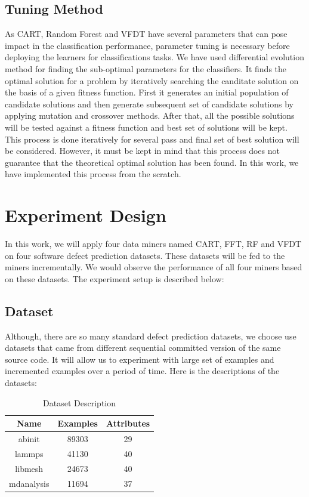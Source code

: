 \documentclass[sigplan]{acmart}\settopmatter{printfolios=true,printccs=false,printacmref=false}
\begin{document}
\subsection{Tuning Method}
As CART, Random Forest and VFDT have several parameters that can pose impact in the classification performance, parameter tuning is necessary before deploying the learners for classifications tasks. We have used differential evolution method for finding the sub-optimal parameters for the classifiers. It finds the optimal solution for a problem by iteratively searching the canditate solution on the basis of a given fitness function. First it generates an initial population of candidate solutions and then generate subsequent set of candidate solutions by applying mutation and crossover methods. After that, all the possible solutions will be tested against a fitness function and best set of solutions will be kept. This process is done iteratively for several pass and final set of best solution will be considered. However, it must be kept in mind that this process does not guarantee that the theoretical optimal solution has been found. In this work, we have implemented this process from the scratch. 


\section{Experiment Design}
In this work, we will apply four data miners named CART, FFT, RF and VFDT on four software defect prediction datasets. These datasets will be fed to the miners incrementally. We would observe the performance of all four miners based on these datasets. The experiment setup is described below:

\subsection{Dataset}
Although, there are so many standard defect prediction datasets, we choose use datasets that came from different sequential committed version of the same source code. It will allow us to experiment with large set of examples and incremented examples over a period of time. Here is the descriptions of the datasets:

\begin{center}
	\begin{table}[h]
			\begin{tabular}{|c|c|c|}
			\hline 
			\textbf{Name} & \textbf{Examples} & \textbf{Attributes} \\ 
			\hline 
			abinit & 89303 & 29 \\ 
			\hline 
			lammps & 41130 & 40 \\ 
			\hline 
			libmesh & 24673 & 40 \\ 
			\hline 
			mdanalysis & 11694 & 37 \\ 
			\hline
		\end{tabular}   
	\caption{Dataset Description}
	\label{tab:dataset}
	\end{table}
\end{center}
\end{document}
